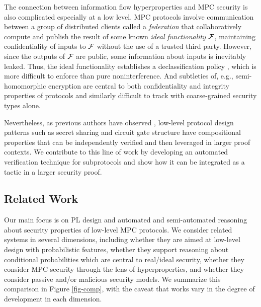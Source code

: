The connection between information flow hyperproperties and
MPC security is also complicated especially at a low level.
MPC protocols involve communication between a group of distributed
clients called a \emph{federation} that collaboratively compute
and publish the result of some known \emph{ideal functionality}
$\mathcal{F}$, maintaining confidentiality of inputs to $\mathcal{F}$ without
the use of a trusted third party. However, since the outputs of
$\mathcal{F}$ are public, some information about inputs is inevitably
leaked. Thus, the ideal
functionality establishes a declassification policy \cite{XXX}, which
is more difficult to enforce than pure noninterference.  And
subtleties of, e.g., semi-homomorphic encryption are central to both
confidentiality and integrity properties of protocols and similarly
difficult to track with coarse-grained security types alone.

Nevertheless, as previous authors have observed \cite{XXX}, low-level
protocol design patterns such as secret sharing and circuit gate
structure have compositional properties that can be independently
verified and then leveraged in larger proof contexts. We
contribute to this line of work by developing an automated
verification technique for subprotocols and show how it can be
integrated as a tactic in a larger security proof.

\compfig

\subsection{Related Work}
\label{section-related-work}

Our main focus is on PL design and automated and semi-automated
reasoning about security properties of low-level MPC protocols.  We
consider related systems in several dimensions, including
whether they are aimed at low-level design with probabilistic features,
whether they support reasoning about conditional probabilities which
are central to real/ideal security, whether they consider MPC
security through the lens of hyperproperties, and whether they consider
passive and/or malicious security models. We summarize this comparison
in Figure \ref{fig-comp}, with the caveat that works vary in the degree
of development in each dimension.

